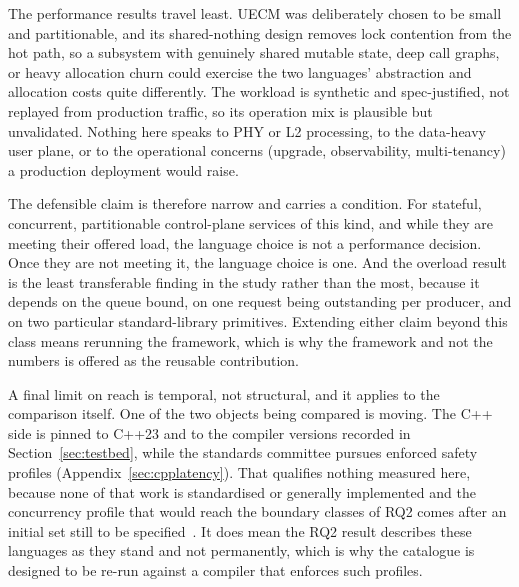 \documentclass[english,oneside,a4paper,censored,csm,software-track-2020]{HYthesisML}
\begin{document}
\begin{appendices}
The performance results travel least. UECM was deliberately chosen to be small and partitionable,
and its shared-nothing design removes lock contention from the hot path, so a subsystem with
genuinely shared mutable state, deep call graphs, or heavy allocation churn could exercise the two
languages' abstraction and allocation costs quite differently. The workload is synthetic and
spec-justified, not replayed from production traffic, so its operation mix is plausible but
unvalidated. Nothing here speaks to PHY or L2 processing, to the data-heavy user plane, or to the
operational concerns (upgrade, observability, multi-tenancy) a production deployment would raise.

The defensible claim is therefore narrow and carries a condition. For stateful, concurrent,
partitionable control-plane services of this kind, and while they are meeting their offered load,
the language choice is not a performance decision. Once they are not meeting it, the language
choice is one. And the overload result is the least transferable finding in the study rather than
the most, because it depends on the queue bound, on one request being outstanding per producer,
and on two particular standard-library primitives. Extending either claim beyond this class means
rerunning the framework, which is why the framework and not the numbers is offered as the reusable
contribution.

A final limit on reach is temporal, not structural, and it applies to the comparison
itself. One of the two objects being compared is moving. The C++ side is pinned to C++23 and to
the compiler versions recorded in Section~\ref{sec:testbed}, while the standards committee pursues
enforced safety profiles (Appendix~\ref{sec:cpplatency}). That qualifies nothing measured here,
because none of that work is standardised or generally implemented and the concurrency profile
that would reach the boundary classes of RQ2 comes after an initial set still to be
specified~\cite{vandevoorde2026profiles}. It does mean the RQ2 result describes these languages as
they stand and not permanently, which is why the catalogue is designed to be re-run against a
compiler that enforces such profiles.


\end{appendices}
\end{document}
